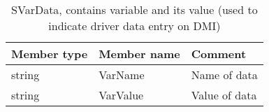 \documentclass{template/openetcs_article}
\begin{document}
\begin{longtable}{|l|l|l|}
	\caption{SVarData, contains variable and its value (used to indicate driver data entry on DMI)} \\ 
	\hline
		\begin{minipage}[t]{0.20\linewidth} \textbf{Member type}	\end{minipage}
	&	\begin{minipage}[t]{0.20\linewidth} \textbf{Member name}	\end{minipage} 
	&	\begin{minipage}[t]{0.65\linewidth} \textbf{Comment} \end{minipage} \\
	\hline
		\begin{minipage}[t]{0.20\linewidth} string \end{minipage} 
	&	\begin{minipage}[t]{0.20\linewidth} VarName \end{minipage} 
	&	\begin{minipage}[t]{0.65\linewidth} Name of data \end{minipage}\\
	\hline
		\begin{minipage}[t]{0.20\linewidth} string \end{minipage} 
	&	\begin{minipage}[t]{0.20\linewidth} VarValue \end{minipage} 
	&	\begin{minipage}[t]{0.65\linewidth} Value of data \end{minipage}\\
	\hline
\end{longtable}

\end{document}
